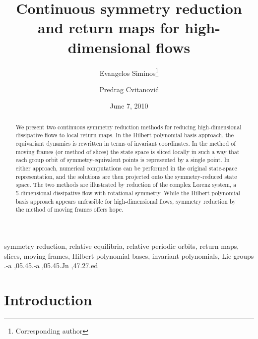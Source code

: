\documentclass[final,number,sort&compress]{elsarticle}
\begin{document}
\begin{frontmatter}

			\title{
Continuous symmetry reduction and return maps for high-dimensional flows
			}

\author{Evangelos Siminos\footnote{Corresponding author}}
\author{Predrag Cvitanovi\'c}
\address{Center for Nonlinear Science,
        School of Physics, Georgia Institute of Technology,
        Atlanta, GA 30332-0430}

\date{June 7, 2010}

        \begin{abstract}
We present two continuous symmetry reduction methods for
reducing high-dimensional dissipative flows to local return
maps. In the Hilbert polynomial basis approach, the equi\-vari\-ant
dynamics is rewritten in terms of in\-vari\-ant coordinates. In the
method of moving frames (or method of slices) the state space
is sliced locally in such a way that each group orbit of
symmetry-equivalent points is represented by a single point. In
either approach, numerical computations can be performed in the
original state-space representation, and the solutions are then
projected onto the symmetry-reduced state space. The two methods
are illustrated by reduction of the complex Lorenz system, a
5-dimensional dissipative flow with rotational symmetry. While
the Hilbert polynomial basis approach appears unfeasible for
high-dimensional flows, symmetry reduction by the method of
moving frames offers hope.
        \end{abstract}

\begin{keyword}
symmetry reduction,
relative equilibria,
relative periodic orbits,
return maps,
slices,
moving frames,
Hilbert polynomial bases,
invariant polynomials,
Lie groups
.-a \sep 05.45.-a \sep 05.45.Jn \sep 47.27.ed
\end{keyword}
\end{frontmatter}

\section{\label{s:intro} Introduction}
\end{document}

